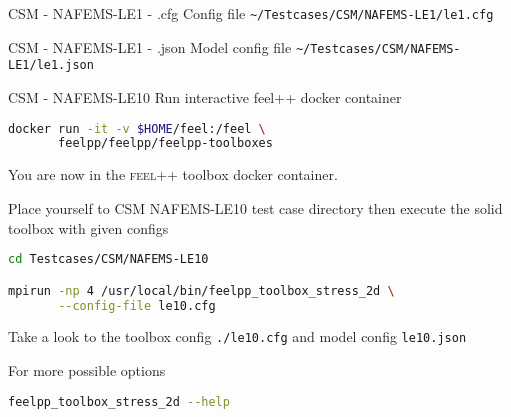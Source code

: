 \begin{frame}{CSM - NAFEMS-LE1 - .cfg}
    Config file \lstinline{~/Testcases/CSM/NAFEMS-LE1/le1.cfg}
\vspace{5mm}
    
\framebreak
\end{frame}


\begin{frame}{CSM - NAFEMS-LE1 - .json}
   Model config file \lstinline{~/Testcases/CSM/NAFEMS-LE1/le1.json}
    
\framebreak
\end{frame}






\begin{frame}{CSM - NAFEMS-LE10}
Run  interactive feel++ docker container

\begin{lstlisting}[language=Bash,mathescape=false,emph={docker}]
docker run -it -v $HOME/feel:/feel \
       feelpp/feelpp/feelpp-toolboxes
\end{lstlisting}

You are now in the \textsc{feel++} toolbox docker container.

Place yourself to CSM NAFEMS-LE10 test case directory then execute the
solid toolbox with given configs

\begin{lstlisting}[language=Bash,mathescape=false, emph={feelpp_toolbox_stress_2d}]
cd Testcases/CSM/NAFEMS-LE10

mpirun -np 4 /usr/local/bin/feelpp_toolbox_stress_2d \
       --config-file le10.cfg
\end{lstlisting}

Take a look to the toolbox config \lstinline{./le10.cfg} and model config
\lstinline{le10.json}

For more possible options
\begin{lstlisting}[language=Bash,mathescape=false, emph={feelpp_toolbox_stress_2d}]
feelpp_toolbox_stress_2d --help
\end{lstlisting}

\end{frame}



